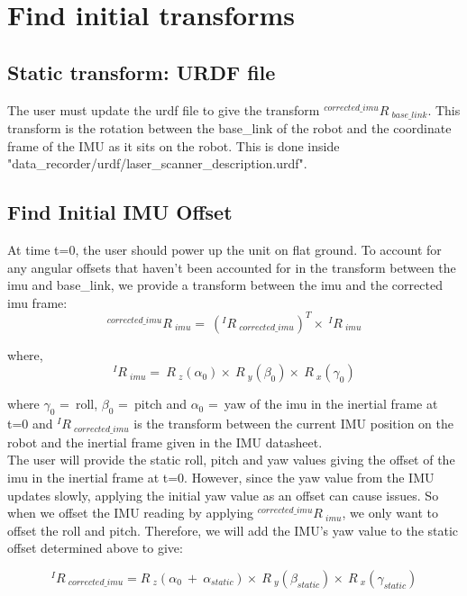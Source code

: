 \documentclass{article}
\begin{document}
\section{Find initial transforms}

\subsection{Static transform: URDF file}
The user must update the urdf file to give the transform $ {^{corrected\_imu}R\ _{base\_link}} $. This transform is the rotation between the base\_link of the robot and the coordinate frame of the IMU as it sits on the robot. This is done inside "data\_recorder/urdf/laser\_scanner\_description.urdf".

\subsection{Find Initial IMU Offset}
At time t=0, the user should power up the unit on flat ground. To account for any angular offsets that haven't been accounted for in the transform between the imu and base\_link, we provide a transform between the imu and the corrected imu frame:
\begin{equation}
^{corrected\_imu}R\ _{imu} =\ (^{I}R\ _{corrected\_imu})^T \times\  ^{I}R\ _{imu}
\end{equation}

where,
\begin{equation}
^{I}R\ _{imu} =\ R\ _z(\alpha_0) \times\  R\ _y(\beta_0) \times\  R\ _x(\gamma_0) 
\end{equation}

where $\gamma_0$ =\ roll, $\beta_0$ =\ pitch and $\alpha_0$ =\ yaw of the imu in the inertial frame at t=0 and $^{I}R\ _{corrected\_imu} $ is the transform between the current IMU position on the robot and the inertial frame given in the IMU datasheet. 
\\

The user will provide the static roll, pitch and yaw values giving the offset of the imu in the inertial frame at t=0. However, since the yaw value from the IMU updates slowly, applying the initial yaw value as an offset can cause issues. So when we offset the IMU reading by applying $^{corrected\_imu}R\ _{imu}$, we only want to offset the roll and pitch. Therefore, we will add the IMU's yaw value to the static offset determined above to give:

\begin{equation}
^{I}R\ _{corrected\_imu} = R\ _z(\alpha_0\ +\ \alpha_{static}) \times\  R\ _y(\beta_{static}) \times\  R\ _x(\gamma_{static})
\end{equation}
\end{document}
